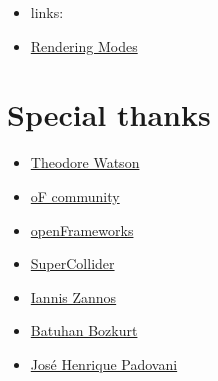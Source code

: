 \documentclass[11pt, a4paper]{scrartcl}
\begin{document}
\begin{itemize}
\item links:
\item \href{http://processingjs.org/reference/articles/RenderingModes}{Rendering Modes}
\end{itemize}
\section{Special thanks}
\label{sec-8}

\begin{itemize}
\item \href{https://github.com/ofTheo/ofxKinect}{Theodore Watson}
\item \href{http://forum.openframeworks.cc/index.php?topic=4947.0}{oF community}
\item \href{http://www.openframeworks.cc/}{openFrameworks}
\item \href{http://supercolliderbook.net/}{SuperCollider}
\item \href{http://earlab.org/}{Iannis Zannos}
\item \href{http://www.earslap.com/}{Batuhan Bozkurt}
\item \href{http://zepadovani.info}{José Henrique Padovani}
\end{itemize}
\end{document}
